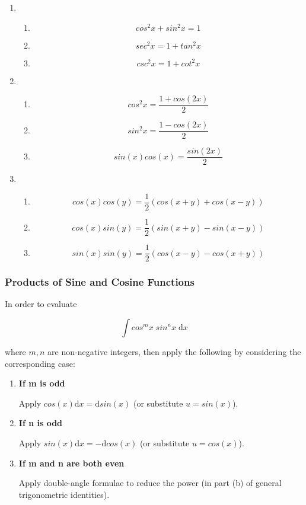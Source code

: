 \documentclass[a4paper,12pt]{article}
\newcommand{\s}{\vspace{1mm}}
\newcommand{\n}{\vspace{3mm}}
\newcommand{\diff}{\mathrm{d}}
\newenvironment{alist}{ %
\begin{enumerate}[label=(\alph*)]
}{
\end{enumerate}
}
\newenvironment{rlist}{ %
\begin{enumerate}[label=(\roman*)]
}{
\end{enumerate}
}
\begin{document}
\begin{alist}
  \item \begin{rlist}
    \item

    $$cos^{2}x+sin^{2}x=1$$

    \item

    $$sec^{2}x=1+tan^{2}x$$

    \item

    $$csc^{2}x=1+cot^{2}x$$
  \end{rlist}
  \item \begin{rlist}
    \item

    $$cos^{2}x=\frac{1+cos(2x)}{2}$$

    \item

    $$sin^{2}x=\frac{1-cos(2x)}{2}$$

    \item

    $$sin(x)cos(x)=\frac{sin(2x)}{2}$$
  \end{rlist}
  \item \begin{rlist}
    \item

    $$cos(x)cos(y)=\frac{1}{2}(cos(x+y)+cos(x-y))$$

    \item

    $$cos(x)sin(y)=\frac{1}{2}(sin(x+y)-sin(x-y))$$

    \item

    $$sin(x)sin(y)=\frac{1}{2}(cos(x-y)-cos(x+y))$$
  \end{rlist}
\end{alist}

\subsubsection{Products of Sine and Cosine Functions}
In order to evaluate

$$\int cos^{m}x\; sin^{n}x\;\diff x$$\s

where $m,n$ are non-negative integers, then apply the following by considering the corresponding case:

\begin{alist}
  \item \textbf{If m is odd}\n

  Apply $cos(x)\diff x=\diff sin(x)$ (or substitute $u=sin(x)$).

  \item \textbf{If n is odd}\n

  Apply $sin(x)\diff x=-\diff cos(x)$ (or substitute $u=cos(x)$).

  \item \textbf{If m and n are both even}\n

  Apply double-angle formulae to reduce the power (in part (b) of general trigonometric identities).
\end{alist}
\end{document}
